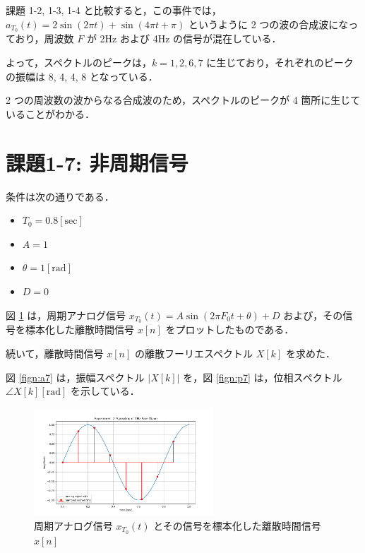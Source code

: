 \documentclass[fleqn, a4paper. 12pt]{jsarticle}
\begin{document}
    課題 1-2, 1-3, 1-4 と比較すると，この事件では，$a_{T_0}(t)=2 \sin (2 \pi t)+\sin (4 \pi t+\pi)$ というように 2 つの波の合成波になっており，周波数 $F$ が 2Hz および 4Hz の信号が混在している．

    よって，スペクトルのピークは，$k = 1, 2, 6, 7$ に生じており，それぞれのピークの振幅は 8, 4, 4, 8 となっている．

    2 つの周波数の波からなる合成波のため，スペクトルのピークが 4 箇所に生じていることがわかる．

  \newpage

  \section*{課題1-7: 非周期信号}

  条件は次の通りである．

  \begin{itemize}
    \item $T_0 = 0.8 [\mathrm{sec}]$
    \item $A = 1$
    \item $\theta = 1 [\mathrm{rad}]$
    \item $D = 0$
  \end{itemize}

  図 \ref{fig:s7} は，周期アナログ信号 $x_{T_0}(t)=A \sin \left(2 \pi F_0 t+\theta\right)+D$ および，その信号を標本化した離散時間信号 $x[n]$ をプロットしたものである．
  
  続いて，離散時間信号 $x[n]$ の離散フーリエスペクトル $X[k]$ を求めた．
  
  図 \ref{fign:a7} は，振幅スペクトル $|X[k]|$ を，図 \ref{fign:p7} は，位相スペクトル $\angle X[k][\mathrm{rad}]$ を示している．

  \begin{figure}[!h]
    \centering
    \includegraphics[width=0.6\textwidth]{sampling_experiment_7.png}
    \caption{周期アナログ信号 $x_{T_0}(t)$ とその信号を標本化した離散時間信号 $x[n]$}
    \label{fig:s7}
  \end{figure}
\end{document}

